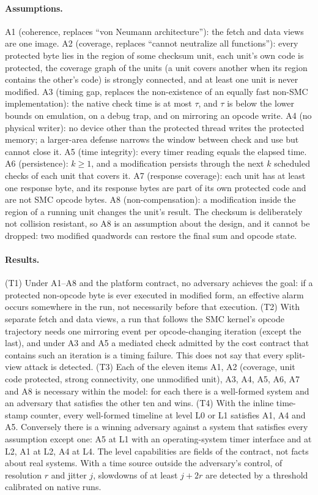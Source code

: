 \documentclass[11pt]{article}
\begin{document}
\paragraph{Assumptions.}
A1 (coherence, replaces ``von Neumann architecture''): the fetch and data views are one image.
A2 (coverage, replaces ``cannot neutralize all functions''): every protected byte lies in the region of some checksum unit, each unit's own code is protected, the coverage graph of the units (a unit covers another when its region contains the other's code) is strongly connected, and at least one unit is never modified.
A3 (timing gap, replaces the non-existence of an equally fast non-SMC implementation): the native check time is at most $\tau$, and $\tau$ is below the lower bounds on emulation, on a debug trap, and on mirroring an opcode write.
A4 (no physical writer): no device other than the protected thread writes the protected memory; a larger-area defense narrows the window between check and use but cannot close it.
A5 (time integrity): every timer reading equals the elapsed time.
A6 (persistence): $k\ge 1$, and a modification persists through the next $k$ scheduled checks of each unit that covers it.
A7 (response coverage): each unit has at least one response byte, and its response bytes are part of its own protected code and are not SMC opcode bytes.
A8 (non-compensation): a modification inside the region of a running unit changes the unit's result.
The checksum is deliberately not collision resistant, so A8 is an assumption about the design, and it cannot be dropped: two modified quadwords can restore the final sum and opcode state.

\paragraph{Results.}
(T1) Under A1--A8 and the platform contract, no adversary achieves the goal: if a protected non-opcode byte is ever executed in modified form, an effective alarm occurs somewhere in the run, not necessarily before that execution.
(T2) With separate fetch and data views, a run that follows the SMC kernel's opcode trajectory needs one mirroring event per opcode-changing iteration (except the last), and under A3 and A5 a mediated check admitted by the cost contract that contains such an iteration is a timing failure.  This does not say that every split-view attack is detected.
(T3) Each of the eleven items A1, A2 (coverage, unit code protected, strong connectivity, one unmodified unit), A3, A4, A5, A6, A7 and A8 is necessary within the model: for each there is a well-formed system and an adversary that satisfies the other ten and wins.
(T4) With the inline time-stamp counter, every well-formed timeline at level L0 or L1 satisfies A1, A4 and A5.  Conversely there is a winning adversary against a system that satisfies every assumption except one: A5 at L1 with an operating-system timer interface and at L2, A1 at L2, A4 at L4.  The level capabilities are fields of the contract, not facts about real systems.
With a time source outside the adversary's control, of resolution $r$ and jitter $j$, slowdowns of at least $j+2r$ are detected by a threshold calibrated on native runs.
\end{document}
